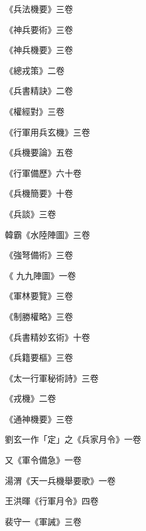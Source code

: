 \begin{pinyinscope}
 《兵法機要》三卷



 《神兵要術》三卷



 《神兵機要》三卷



 《總戎策》二卷



 《兵書精訣》二卷



 《權經對》三卷



 《行軍用兵玄機》三卷



 《兵機要論》五卷



 《行軍備歷》六十卷



 《兵機簡要》十卷



 《兵談》三卷



 韓霸《水陸陣圖》三卷



 《強弩備術》三卷



 《
 九九陣圖》一卷



 《軍林要覽》三卷



 《制勝權略》三卷



 《兵書精妙玄術》十卷



 《兵籍要樞》三卷



 《太一行軍秘術詩》三卷



 《戎機》二卷



 《通神機要》三卷



 劉玄一作「定」之《兵家月令》一卷



 又《軍令備急》一卷



 湯渭《天一兵機舉要歌》一卷



 王洪暉《行軍月令》四卷



 裴守一《軍誡》三卷




\end{pinyinscope}
